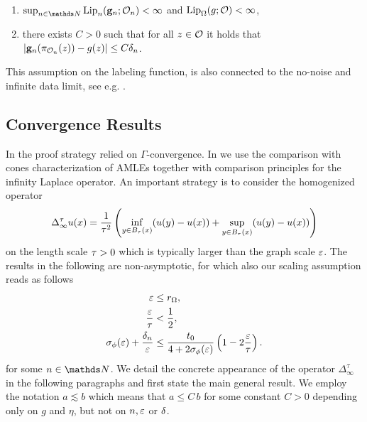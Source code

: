\begin{enumerate}[label=(C\arabic*)]
\item\label{ass:dataA} $\sup_{n\in\N}\Lip_n(\vec g_n;\conset_n)<\infty$ and $\operatorname{Lip}_\Omega(g;\mathcal{O})<\infty$,
\item\label{ass:dataB} there exists $C>0$ such that for all $z\in\mathcal{O}$ it holds that $\left|\mathbf{g}_n(\pi_{\mathcal{O}_n}(z))-g(z)\right|\leq C\delta_n$.
\end{enumerate}
%
%
This assumption on the labeling function, is also connected to the no-noise and infinite data limit, see e.g. \cite{hoffmann2020consistency}.
%
%
\subsection{Convergence Results}
%
%
In \cite{roith2022continuum} the proof strategy relied on $\Gamma$-convergence. In \cite{bungert2021uniform} we use the comparison with cones characterization of AMLEs together with comparison principles for the infinity Laplace operator. An important strategy is to consider the homogenized operator
%
\begin{align}\label{eq:homop}
\Delta_\infty^\tau u(x) = \frac{1}{\tau^2}\left(\inf_{y\in B_\tau(x)}(u(y)-u(x))
+
\sup_{y\in B_\tau(x)}(u(y)-u(x))\right)
\end{align}
%
%
on the length scale $\tau>0$ which is typically larger than the graph scale $\varepsilon$. The results in the following are non-asymptotic, for which also our scaling assumption reads as follows
%
\begin{align}\label{ass:scaling}
\begin{aligned}
\varepsilon &\leq {r_\Omega,} \\
\frac{\varepsilon}{\tau} &< \frac{1}{2}, \\
\sigma_\phi(\varepsilon) + \frac{\delta_n}{\varepsilon} 
&\leq
\frac{t_0}{4+2\sigma_\phi(\varepsilon)}
\left(1-2\frac{\varepsilon}{\tau}\right).
\end{aligned}
\end{align}
%
for some $n\in\N$. We detail the concrete appearance of the operator $\Delta^\tau_\infty$ in the following paragraphs and first state the main general result. We employ the notation $a\lesssim b$ which means that $a\leq C\,b$ for some constant $C>0$ depending only on $g$ and $\eta$, but not on $n, \varepsilon$ or $\delta$.
%
